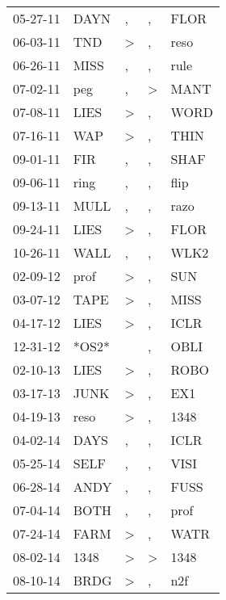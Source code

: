 \begin{supertabular}{lllll}
 05-27-11 &   DAYN &             , &             , &   FLOR \\
 06-03-11 &    TND &  \textgreater &             , &   reso \\
 06-26-11 &   MISS &             , &             , &   rule \\
 07-02-11 &    peg &             , &  \textgreater &   MANT \\
 07-08-11 &   LIES &  \textgreater &             , &   WORD \\
 07-16-11 &    WAP &  \textgreater &             , &   THIN \\
 09-01-11 &    FIR &             , &             , &   SHAF \\
 09-06-11 &   ring &             , &             , &   flip \\
 09-13-11 &   MULL &             , &             , &   razo \\
 09-24-11 &   LIES &  \textgreater &             , &   FLOR \\
 10-26-11 &   WALL &             , &             , &   WLK2 \\
 02-09-12 &   prof &  \textgreater &             , &    SUN \\
 03-07-12 &   TAPE &  \textgreater &             , &   MISS \\
 04-17-12 &   LIES &  \textgreater &             , &   ICLR \\
 12-31-12 &  *OS2* &               &             , &   OBLI \\
 02-10-13 &   LIES &  \textgreater &             , &   ROBO \\
 03-17-13 &   JUNK &  \textgreater &             , &    EX1 \\
 04-19-13 &   reso &  \textgreater &             , &   1348 \\
 04-02-14 &   DAYS &             , &             , &   ICLR \\
 05-25-14 &   SELF &             , &             , &   VISI \\
 06-28-14 &   ANDY &             , &             , &   FUSS \\
 07-04-14 &   BOTH &             , &             , &   prof \\
 07-24-14 &   FARM &  \textgreater &             , &   WATR \\
 08-02-14 &   1348 &  \textgreater &  \textgreater &   1348 \\
 08-10-14 &   BRDG &  \textgreater &             , &    n2f \\

\end{supertabular}
